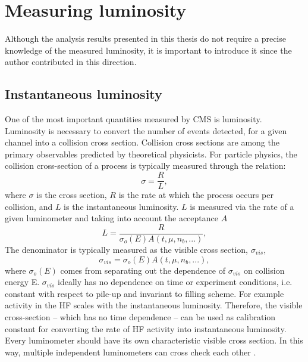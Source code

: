 \setlength\abovedisplayskip{0.4pt}
\setlength\belowdisplayskip{0.4pt}

\chapter{Measuring luminosity}

Although the analysis results presented in this thesis do not require a precise knowledge of the measured luminosity, it is important to introduce it since the author contributed in this direction. 

\section{Instantaneous luminosity}

One of the most important quantities measured by CMS is luminosity. Luminosity is necessary to convert the number of events detected, for a given channel into a collision cross section. Collision cross sections are among the primary observables predicted by theoretical physicists. For particle physics, the collision cross-section of a process is typically measured through the relation:
\begin{equation}
\sigma  = \frac{R}{\mathit{L}} ,
\end{equation}
where $\sigma$ is the cross section, $R$ is the rate at which the process occurs per collision, and $L$ is the instantaneous luminosity. $L$ is measured via the rate of a given luminometer and taking into account the acceptance $A$
\begin{equation}
L  = \frac{R}{ \sigma_{o}(E) A(t,\mu,n_b,...)} ,
\end{equation}
The denominator is typically measured as the visible cross section, $\sigma_{vis}$,
\begin{equation}
\sigma_{vis}  = \sigma_{o}(E) A(t,\mu,n_b,...),
\end{equation}
where $\sigma_{o}(E)$ comes from separating out the dependence of $\sigma_{vis}$ on collision energy E. $\sigma_{vis}$ ideally has no dependence on time or experiment conditions, i.e. constant with respect to pile-up and invariant to filling scheme. For example activity in the HF scales with the instantaneous luminosity. Therefore, the visible cross-section -- which has no time dependence -- can be used as calibration constant for converting the rate of HF activity into instantaneous luminosity. Every luminometer should have its own characteristic visible cross section. In this way, multiple independent luminometers can cross check each other \cite{CMS:2013gfa,cmsLumi,Krasny:2006xg}.

